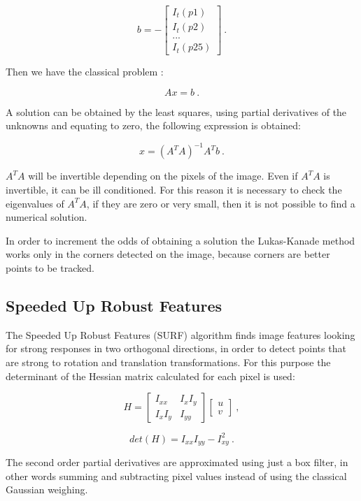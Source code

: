 $$
b=
-\begin{bmatrix}
I_t(p1) \\
I_t(p2) \\
...     \\
I_t(p25) 
\end{bmatrix} \ .
$$

\noindent Then we have the classical problem :

$$ 
Ax = b\ .
$$

\noindent A solution can be obtained by the least squares, using partial derivatives of the unknowns and equating to zero, the following expression
 is obtained:

$$
x = (A^T A)^{-1} A^T b \ .
$$


\noindent $A^T A$ will be invertible depending on the pixels of the image. Even if $A^T A $ is invertible, it can be ill conditioned. For this reason it is necessary to check the eigenvalues of $A^T A$, if they are zero or very small, then it is not possible to find a numerical solution.

In order to increment the odds of obtaining a solution the Lukas-Kanade method works only in the corners detected on the image, because corners are better points to be tracked.

\subsection{Speeded Up Robust Features}
\label{sec:surf}

The Speeded Up Robust Features (SURF) algorithm finds image features looking for strong responses in two orthogonal directions, in order to detect points that are strong to rotation and translation transformations. For this purpose the determinant of the Hessian matrix calculated for each pixel is used:


$$
H = \begin{bmatrix} I_{xx} & I_x I_y \\ I_x I_y & I_{yy} \end{bmatrix} \begin{bmatrix} u \\ v \end{bmatrix} \ ,
$$

$$
det(H) = I_{xx} I_{yy} - I_{xy}^2\ .
$$


\noindent The second order partial derivatives are approximated using just a box filter, in other words 
summing and subtracting pixel values instead of using the classical Gaussian weighing. 


